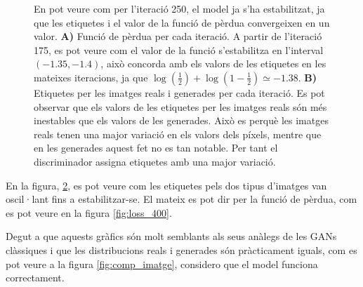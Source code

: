 \begin{figure}[H]
\begin{subfigure}{0.45\textwidth}
		\caption{} \label{fig:labels_400}
	\end{subfigure}
	\caption{En pot veure com per l'iteració 250, el model ja s'ha estabilitzat, ja que les etiquetes i el valor de la funció de pèrdua convergeixen en un valor. \textbf{A)} Funció de pèrdua per cada iteració. A partir de l'iteració 175, es pot veure com el valor de la funció s'estabilitza en l'interval $(-1.35, -1.4)$, això concorda amb els valors de les etiquetes en les mateixes iteracions, ja que $\log(\frac{1}{2}) + \log(1-\frac{1}{2}) \simeq -1.38$. \textbf{B)} Etiquetes per les imatges reals i generades per cada iteració. Es pot observar que els valors de les etiquetes per les imatges reals són més inestables que els valors de les generades. Això es perquè les imatges reals tenen una major variació en els valors dels píxels, mentre que en les generades aquest fet no es tan notable. Per tant el discriminador assigna etiquetes amb una major variació.}
\end{figure}

En la figura, \ref{fig:labels_400}, es pot veure com les etiquetes pels dos tipus d'imatges van oscil·lant fins a estabilitzar-se. El mateix es pot dir per la funció de pèrdua, com es pot veure en la figura \ref{fig:loss_400}.  

Degut a que aquests gràfics són molt semblants als seus anàlegs de les GANs clàssiques i que les distribucions reals i generades són pràcticament iguals, com es pot veure a la figura \ref{fig:comp_imatge}, considero que el model funciona correctament. 


